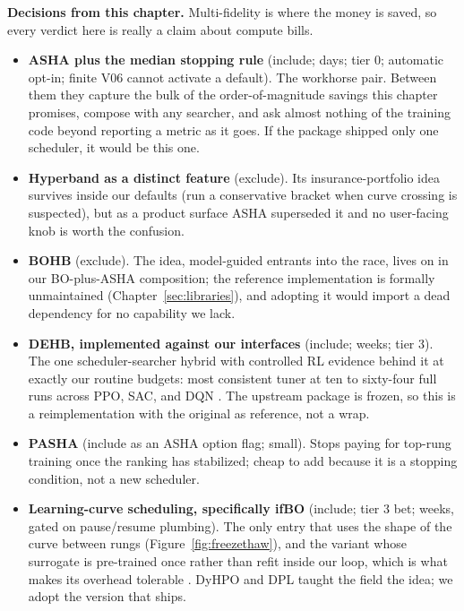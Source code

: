 \begin{decisions}
\noindent\textbf{Decisions from this chapter.} Multi-fidelity is where
the money is saved, so every verdict here is really a claim about
compute bills.
\begin{itemize}[leftmargin=1.3em, itemsep=2pt]
\item \textbf{ASHA plus the median stopping rule} (include; days;
tier 0; automatic opt-in; finite V06 cannot activate a default). The workhorse pair. Between them they capture the bulk of the
order-of-magnitude savings this chapter promises, compose with any
searcher, and ask almost nothing of the training code beyond reporting
a metric as it goes. If the package shipped only one scheduler, it
would be this one.
\item \textbf{Hyperband as a distinct feature} (exclude). Its
insurance-portfolio idea survives inside our defaults (run a
conservative bracket when curve crossing is suspected), but as a
product surface ASHA superseded it and no user-facing knob is worth
the confusion.
\item \textbf{BOHB} (exclude). The idea, model-guided entrants into
the race, lives on in our BO-plus-ASHA composition; the reference
implementation is formally unmaintained
(Chapter~\ref{sec:libraries}), and adopting it would import a dead
dependency for no capability we lack.
\item \textbf{DEHB, implemented against our interfaces} (include;
weeks; tier 3). The one scheduler-searcher hybrid with controlled RL
evidence behind it at exactly our routine budgets: most consistent
tuner at ten to sixty-four full runs across PPO, SAC, and DQN
\citep{eimer2023hyperparameters}. The upstream package is frozen, so
this is a reimplementation with the original as reference, not a
wrap.
\item \textbf{PASHA} (include as an ASHA option flag; small). Stops
paying for top-rung training once the ranking has stabilized; cheap
to add because it is a stopping condition, not a new scheduler.
\item \textbf{Learning-curve scheduling, specifically ifBO} (include;
tier 3 bet; weeks, gated on pause/resume plumbing). The only entry
that uses the shape of the curve between rungs
(Figure~\ref{fig:freezethaw}), and the variant whose surrogate is
pre-trained once rather than refit inside our loop, which is what
makes its overhead tolerable \citep{rakotoarison2024ifbo}. DyHPO and
DPL taught the field the idea; we adopt the version that ships.
\end{itemize}
\end{decisions}

